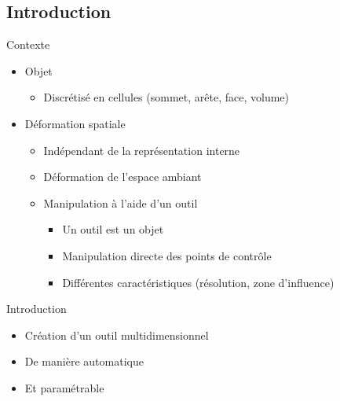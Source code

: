 \documentclass[xcolor=x11names,compress]{beamer}
\renewcommand{\(}{\begin{columns}} \renewcommand{\)}{\end{columns}}
\newcommand{\<}[1]{\begin{column}{#1}} \renewcommand{\>}{\end{column}}
\begin{document}
\subsection{Introduction}

\begin{frame}{Contexte}
  \begin{itemize}
  \item Objet
    \begin{itemize}
    \item Discrétisé en cellules (sommet, arête, face, volume)
    \end{itemize}
  \item Déformation spatiale
    \begin{itemize}
    \item Indépendant de la représentation interne
    \item Déformation de l'espace ambiant
    \item Manipulation à l'aide d'un outil
      \begin{itemize}
      \item Un outil est un objet
      \item Manipulation directe des points de contrôle
      \item Différentes caractéristiques (résolution, zone
        d'influence)
      \end{itemize}
    \end{itemize}
  \end{itemize}
\end{frame}

\begin{frame}{Introduction}
  \begin{itemize}
  \item Création d'un outil multidimensionnel
  \item De manière automatique
  \item Et paramétrable
  \end{itemize}
\end{frame}
\end{document}
